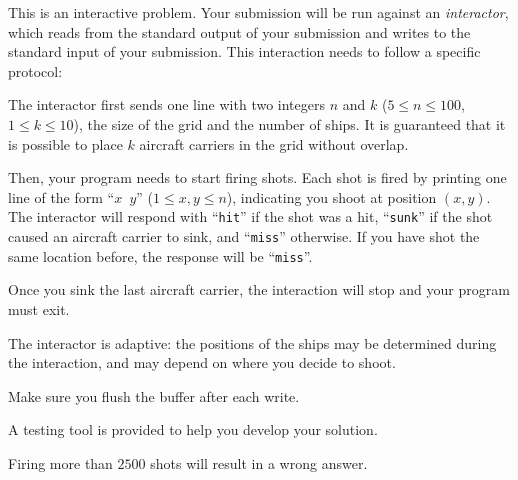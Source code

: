 
    This is an interactive problem.
    Your submission will be run against an \emph{interactor},
    which reads from the standard output of your submission
    and writes to the standard input of your submission.
    This interaction needs to follow a specific protocol:

    The interactor first sends
    one line with two integers $n$ and $k$ ($5 \le n \le 100$, $1 \le k \le 10$),
    the size of the grid and the number of ships.
    It is guaranteed that it is possible to place $k$ aircraft carriers in the grid without overlap.

    Then, your program needs to start firing shots.
    Each shot is fired by printing one line of the form ``\texttt{$x$~$y$}'' ($1 \le x,y \le n$),
    indicating you shoot at position $(x, y)$.
    The interactor will respond with ``\texttt{hit}'' if the shot was a hit,
    ``\texttt{sunk}'' if the shot caused an aircraft carrier to sink, and ``\texttt{miss}'' otherwise.
    If you have shot the same location before,
    the response will be ``\texttt{miss}''.

    Once you sink the last aircraft carrier,
    the interaction will stop and your program must exit.

    The interactor is adaptive:
    the positions of the ships may be determined during the interaction,
    and may depend on where you decide to shoot.

    Make sure you flush the buffer after each write.

    A testing tool is provided to help you develop your solution.

    Firing more than $2500$ shots will result in a wrong answer.
